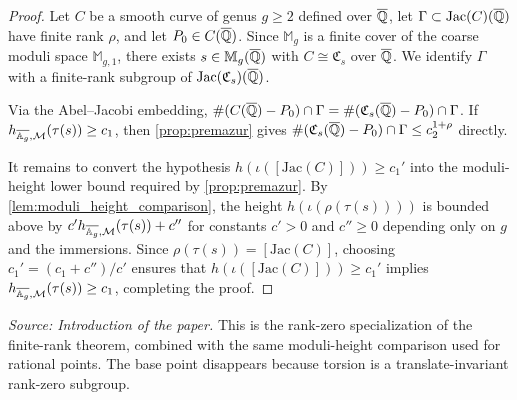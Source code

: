 \begin{proof}
  Let \(C\) be a smooth curve of genus \(g \ge 2\) defined over \(\overline{\mathbb{Q}}\),
  let \(\Gamma \subset \mathrm{Jac}(C)(\overline{\mathbb{Q}})\) have finite rank \(\rho\),
  and let \(P_0 \in C(\overline{\mathbb{Q}})\). Since \(\mathbb{M}_g\) is a finite cover of
  the coarse moduli space \(\mathbb{M}_{g,1}\), there exists
  \(s \in \mathbb{M}_g(\overline{\mathbb{Q}})\) with \(C \cong \mathfrak{C}_s\) over \(\overline{\mathbb{Q}}\).
  We identify \(\Gamma\) with a finite-rank subgroup of
  \(\mathrm{Jac}(\mathfrak{C}_s)(\overline{\mathbb{Q}})\).

  Via the Abel--Jacobi embedding,
  \(\#(C(\overline{\mathbb{Q}}) - P_0) \cap \Gamma = \#(\mathfrak{C}_s(\overline{\mathbb{Q}}) - P_0) \cap \Gamma\).
  If \(h_{\overline{\mathbb{A}_g},\mathcal{M}}(\tau(s)) \ge c_1\), then \cref{prop:premazur}
  gives \(\#(\mathfrak{C}_s(\overline{\mathbb{Q}}) - P_0) \cap \Gamma \le c_2^{1+\rho}\)
  directly.

  It remains to convert the hypothesis \(h(\iota([\mathrm{Jac}(C)])) \ge c_1'\)
  into the moduli-height lower bound required by \cref{prop:premazur}. By
  \cref{lem:moduli_height_comparison}, the height \(h(\iota(\rho(\tau(s))))\)
  is bounded above by \(c' h_{\overline{\mathbb{A}_g},\mathcal{M}}(\tau(s)) + c''\)
  for constants \(c' > 0\) and \(c'' \ge 0\) depending only on \(g\) and the
  immersions. Since \(\rho(\tau(s)) = [\mathrm{Jac}(C)]\), choosing
  \(c_1' = (c_1 + c'')/c'\) ensures that
  \(h(\iota([\mathrm{Jac}(C)])) \ge c_1'\) implies
  \(h_{\overline{\mathbb{A}_g},\mathcal{M}}(\tau(s)) \ge c_1\), completing the proof.
\end{proof}

\begin{theorem}
  \label{thm:bd_tor_intro_nf}
  \textit{Source: Introduction of the paper.}
  This is the rank-zero specialization of the finite-rank theorem, combined with
  the same moduli-height comparison used for rational points. The base point
  disappears because torsion is a translate-invariant rank-zero subgroup.
\end{theorem}

